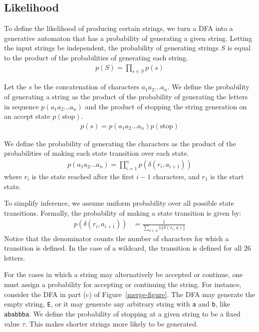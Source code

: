 \documentclass[10pt,letterpaper]{article}
\begin{document}
\subsection{Likelihood}
To define the likelihood of producing certain strings, we turn a DFA into a generative automaton that has a probability of generating a given string. Letting the input strings be independent, the probability of generating strings $S$ is equal to the product of the probabilities of generating each string.
\begin{align*}
	p(S) = \prod_{s \in S} p(s)
\end{align*}

Let the $s$ be the concatenation of characters $a_1a_2...a_n$. We define the probability of generating a string as the product of the probability of generating the letters in sequence $p(a_1a_2...a_n)$ and the product of stopping the string generation on an accept state $p(\text{stop})$.
\begin{align*}
	p(s) = p(a_1a_2...a_n)p(\text{stop})
\end{align*}

We define the probability of generating the characters as the product of the probabilities of making each state transition over each state.
\begin{align*}
	p(a_1a_2 ... a_n) = \prod_{i=1}^{n}p(\delta(r_i, a_{i+1}))
\end{align*}
where $r_i$ is the state reached after the first $i-1$ characters, and $r_1$ is the start state.

To simplify inference, we assume uniform probability over all possible state transitions. Formally, the probability of making a state transition is given by:
\begin{align*}
	p(\delta(r_i, a_{i+1})) &= \frac{1}{\sum_{a\in A} 1\{\delta(r_i, a)\}}
\end{align*}
Notice that the denominator counts the number of characters for which a transition is defined. In the case of a wildcard, the transition is defined for all 26 letters.

For the cases in which a string may alternatively be accepted or continue, one must assign a probability for accepting or continuing the string. For instance, consider the DFA in part (c) of Figure~\ref{merge-figure}. The DFA may generate the empty string, \verb!E!, or it may generate any arbitrary string with \verb!a! and \verb!b!, like \verb!ababbba!. We define the probability of stopping at a given string to be a fixed value $\tau$. This makes shorter strings more likely to be generated.
\end{document}
